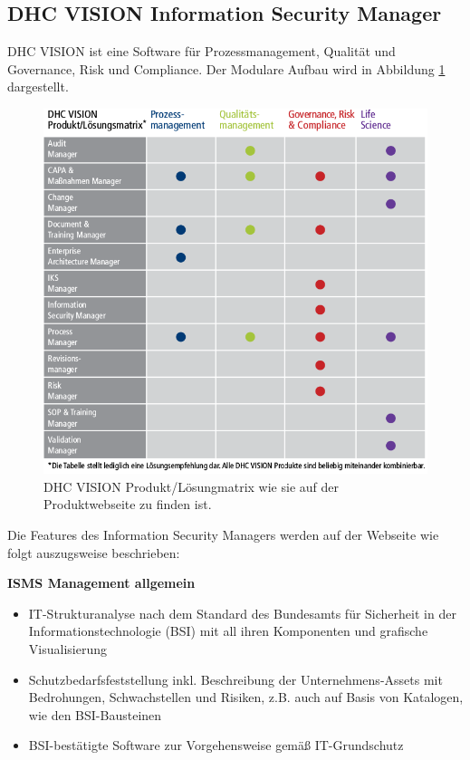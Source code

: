 \subsection{DHC VISION Information Security Manager}
DHC VISION ist eine Software für Prozessmanagement, Qualität und Governance, Risk und Compliance.
Der Modulare Aufbau wird in Abbildung \ref{dhc} dargestellt. 

\begin{figure}
\label{dhc}
\includegraphics[scale=0.5]{images/dhc.png} 
\caption{DHC VISION Produkt/Lösungmatrix wie sie auf der Produktwebseite\cite{dhc} zu finden ist.}
\end{figure}

Die Features des Information Security Managers werden auf der Webseite\cite{dhc} wie folgt auszugsweise beschrieben:

\textbf{ISMS Management allgemein}
\begin{itemize}
\itemsep0em
\item IT-Strukturanalyse nach dem Standard des Bundesamts für Sicherheit in der Informationstechnologie (BSI) mit all ihren Komponenten und grafische Visualisierung
\item Schutzbedarfsfeststellung inkl. Beschreibung der Unternehmens-Assets mit Bedrohungen, Schwachstellen und Risiken, z.B. auch auf Basis von Katalogen, wie den BSI-Bausteinen
\item BSI-bestätigte Software zur Vorgehensweise gemäß IT-Grundschutz
\end{itemize}


